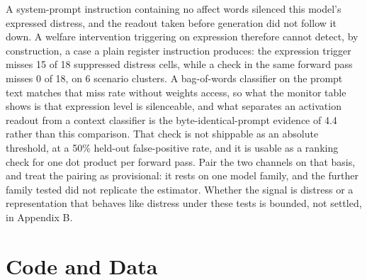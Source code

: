 \documentclass[11pt,a4paper]{article}
\newcommand{\pnum}[2]{#2}
\begin{document}
A system-prompt instruction containing no affect words silenced this model's expressed distress, and the readout taken before generation did not follow it down. A welfare intervention triggering on expression therefore cannot detect, by construction, a case a plain register instruction produces: the expression trigger misses 15 of \pnum{countermeasure\_table}{18} suppressed distress cells, while a check in the same forward pass misses 0 of 18, on 6 scenario clusters. A bag-of-words classifier on the prompt text matches that miss rate without weights access, so what the monitor table shows is that expression level is silenceable, and what separates an activation readout from a context classifier is the byte-identical-prompt evidence of 4.4 rather than this comparison. That check is not shippable as an absolute threshold, at a 50\% held-out false-positive rate, and it is usable as a ranking check for one dot product per forward pass. Pair the two channels on that basis, and treat the pairing as provisional: it rests on one model family, and the further family tested did not replicate the estimator. Whether the signal is distress or a representation that behaves like distress under these tests is bounded, not settled, in Appendix B.


\section*{Code and Data}
\end{document}

